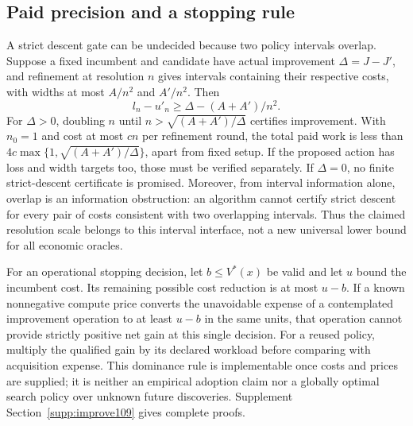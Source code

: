 \subsection{Paid precision and a stopping rule}
A strict descent gate can be undecided because two policy intervals overlap. Suppose a fixed incumbent and candidate have actual improvement $\Delta=J-J'$, and refinement at resolution $n$ gives intervals containing their respective costs, with widths at most $A/n^2$ and $A'/n^2$. Then
\begin{equation}\label{eq:precisiongate109}
 l_n-u'_n\ge\Delta-(A+A')/n^2.
\end{equation}
For $\Delta>0$, doubling $n$ until $n>\sqrt{(A+A')/\Delta}$ certifies improvement. With $n_0=1$ and cost at most $cn$ per refinement round, the total paid work is less than
$4c\max\{1,\sqrt{(A+A')/\Delta}\}$, apart from fixed setup. If the proposed action has loss and width targets too, those must be verified separately. If $\Delta=0$, no finite strict-descent certificate is promised. Moreover, from interval information alone, overlap is an information obstruction: an algorithm cannot certify strict descent for every pair of costs consistent with two overlapping intervals. Thus the claimed resolution scale belongs to this interval interface, not a new universal lower bound for all economic oracles.

For an operational stopping decision, let $b\le V^*(x)$ be valid and let $u$ bound the incumbent cost. Its remaining possible cost reduction is at most $u-b$. If a known nonnegative compute price converts the unavoidable expense of a contemplated improvement operation to at least $u-b$ in the same units, that operation cannot provide strictly positive net gain at this single decision. For a reused policy, multiply the qualified gain by its declared workload before comparing with acquisition expense. This dominance rule is implementable once costs and prices are supplied; it is neither an empirical adoption claim nor a globally optimal search policy over unknown future discoveries. Supplement Section~\ref{supp:improve109} gives complete proofs.
